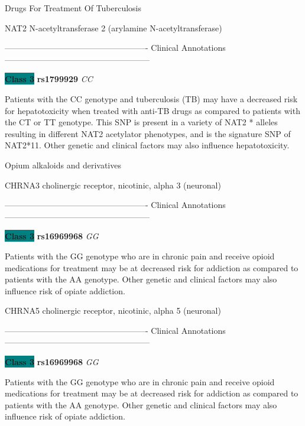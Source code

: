 \documentclass{resume} %
\begin{document}
\begin{rSection}{ Drugs For Treatment Of Tuberculosis }
\begin{rSubsection}{ NAT2 }{ N-acetyltransferase 2 (arylamine N-acetyltransferase) }{}{}
\item[] ---------------------------------------------------- Clinical Annotations -----------------------------------------------------\newline
\item \textbf{\colorbox{teal} {Class 3}} \textbf{ rs1799929 } \textit{ CC }
\item[] Patients with the CC genotype and tuberculosis (TB) may have a decreased risk for hepatotoxicity when treated with anti-TB drugs as compared to patients with the CT or TT genotype. This SNP is present in a variety of NAT2 * alleles resulting in different NAT2 acetylator phenotypes, and is the signature SNP of NAT2*11. Other genetic and clinical factors may also influence hepatotoxicity.
\end{rSubsection}

\end{rSection}\begin{rSection}{ Opium alkaloids and derivatives }
\item[]

\begin{rSubsection}{ CHRNA3 }{ cholinergic receptor, nicotinic, alpha 3 (neuronal) }{}{}
\item[]

\item[] ---------------------------------------------------- Clinical Annotations -----------------------------------------------------\newline
\item \textbf{\colorbox{teal} {Class 3}} \textbf{ rs16969968 } \textit{ GG }
\item[] Patients with the GG genotype who are in chronic pain and receive opioid medications for treatment may be at decreased risk for addiction as compared to patients with the AA genotype. Other genetic and clinical factors may also influence risk of opiate addiction.
\end{rSubsection}\begin{rSubsection}{ CHRNA5 }{ cholinergic receptor, nicotinic, alpha 5 (neuronal) }{}{}
\item[]

\item[] ---------------------------------------------------- Clinical Annotations -----------------------------------------------------\newline
\item \textbf{\colorbox{teal} {Class 3}} \textbf{ rs16969968 } \textit{ GG }
\item[] Patients with the GG genotype who are in chronic pain and receive opioid medications for treatment may be at decreased risk for addiction as compared to patients with the AA genotype. Other genetic and clinical factors may also influence risk of opiate addiction.
\end{rSubsection}


\end{rSection}
\end{document}
